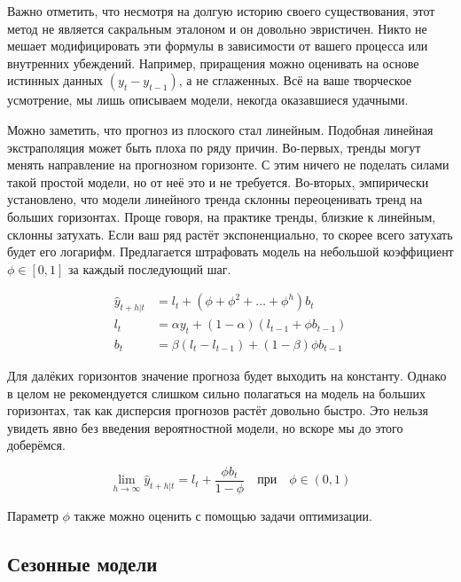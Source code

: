 \documentclass[12pt,fleqn]{article}
\begin{document}
Важно отметить, что несмотря на долгую историю своего существования, этот метод не является сакральным эталоном и он довольно эвристичен.
Никто не мешает модифицировать эти формулы в зависимости от вашего процесса или внутренних убеждений.
Например, приращения можно оценивать на основе истинных данных $(y_t - y_{t-1})$, а не сглаженных.
Всё на ваше творческое усмотрение, мы лишь описываем модели, некогда оказавшиеся удачными.

Можно заметить, что прогноз из плоского стал линейным.
Подобная линейная экстраполяция может быть плоха по ряду причин.
Во-первых, тренды могут менять направление на прогнозном горизонте.
С этим ничего не поделать силами такой простой модели, но от неё это и не требуется.
Во-вторых, эмпирически установлено, что модели линейного тренда склонны переоценивать тренд на больших горизонтах.
Проще говоря, на практике тренды, близкие к линейным, склонны затухать.
Если ваш ряд растёт экспоненциально, то скорее всего затухать будет его логарифм.
Предлагается штрафовать модель на небольшой коэффициент $\phi \in [0, 1]$ за каждый последующий шаг.

\begin{equation}
  \begin{split}
    \hat{y}_{t+h|t } &= l_t + (\phi + \phi^2 + \ldots + \phi^h) b_t \\
    l_t &=\alpha y_t +(1-\alpha)(l_{t-1} + \phi b_{t-1}) \\
    b_t &=\beta (l_t - l_{t-1}) +(1-\beta) \phi b_{t-1}
  \end{split}
\end{equation}

Для далёких горизонтов значение прогноза будет выходить на константу.
Однако в целом не рекомендуется слишком сильно полагаться на модель на больших горизонтах, так как дисперсия прогнозов растёт довольно быстро.
Это нельзя увидеть явно без введения вероятностной модели, но вскоре мы до этого доберёмся.

\begin{equation}
  \lim\limits_{h\rightarrow\infty}   \hat{y}_{t+h|t} =  l_t + \frac{\phi b_t}{1-\phi} \quad \text{при} \quad \phi \in (0, 1)
\end{equation}

Параметр $\phi$ также можно оценить с помощью задачи оптимизации.

\subsection{Сезонные модели}
\end{document}
